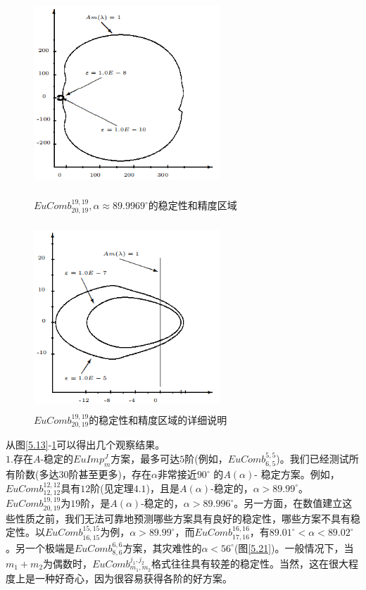 \documentclass[12pt,a4paper]{article}
\begin{document}
\begin{figure}[H]
	{
		\begin{minipage}{6cm}
			\centering
			\includegraphics[width=7cm,height=7cm]{./figures/23.png}
			\caption{$EuComb_{20,19}^{19,19}, \alpha \approx 89.9969^{\circ}$的稳定性和精度区域}
			\label{5.23}
		\end{minipage}
	}
	{
		\begin{minipage}{6cm}
			\centering
			\includegraphics[width=7cm,height=7cm]{./figures/24.png}
			\caption{$EuComb_{20,19}^{19,19}$的稳定性和精度区域的详细说明}
			\label{5.24}
		\end{minipage}
	}
\end{figure}
从图\ref{5.13}-\ref{5.24}可以得出几个观察结果。\\

$1$.存在$A$-稳定的$EuImp^J_m$方案，最多可达$5$阶(例如，$EuComb^{5,5}_{6,5}$)。我们已经测试所有阶数(多达$30$阶甚至更多)，存在$\alpha$非常接近$90^{\circ}$ 的$A(\alpha)$- 稳定方案。例如，$EuComb_{12,12}^{12,12}$具有$12$阶(见定理$4.1$)，且是$A(\alpha)$-稳定的，$\alpha>89.99^{\circ}$。$EuComb^{19,19}_{20,19}$为$19$阶，是$A(\alpha)$-稳定的，$\alpha>89.996^{\circ}$。另一方面，在数值建立这些性质之前，我们无法可靠地预测哪些方案具有良好的稳定性，哪些方案不具有稳定性。以$EuComb^{15,15}_{16,15}$为例，$\alpha>89.99^{\circ}$，而$EuComb^{16,16}_{17,16}$，有$89.01^{\circ}<\alpha<89.02^{\circ}$。另一个极端是$EuComb^{6,6}_{8,6}$方案，其灾难性的$\alpha<56^{\circ}$(图\ref{5.21})。一般情况下，当$m_1+m_2$为偶数时，$EuComb^{j_1,j_2}_{m_1,m_2}$格式往往具有较差的稳定性。当然，这在很大程度上是一种好奇心，因为很容易获得各阶的好方案。\\
\end{document}
